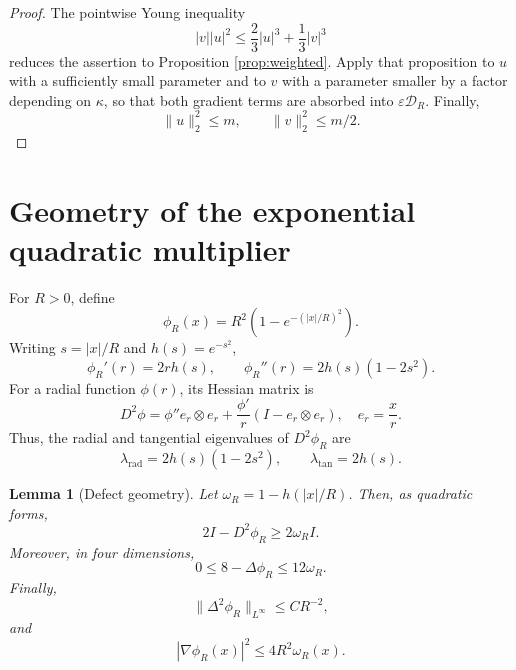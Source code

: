 \documentclass[10pt,a4paper]{amsart}
\numberwithin{equation}{section}
\newtheorem{lemma}[theorem]{Lemma}
\begin{document}
\begin{proof}
The pointwise Young inequality
\[
 |v||u|^2\le \frac23|u|^3+\frac13|v|^3
\]
reduces the assertion to Proposition \ref{prop:weighted}.  Apply that proposition to $u$ with a sufficiently small parameter and to $v$ with a parameter smaller by a factor depending on $\kappa$, so that both gradient terms are absorbed into $\varepsilon\mathcal D_R$.  Finally,
\[
 \|u\|_2^2\le m, \qquad \|v\|_2^2\le m/2.
\]
\end{proof}

\section{Geometry of the exponential quadratic multiplier}\label{sec:geometry}

For $R>0$, define
\begin{equation*}
 \phi_R(x)=R^2\left(1-e^{-(|x|/R)^2}\right).
\end{equation*}
Writing $s=|x|/R$ and $h(s)=e^{-s^2}$,
\begin{equation*}
 \phi_R'(r)=2rh(s), \qquad \phi_R''(r)=2h(s)(1-2s^2).
\end{equation*}
For a radial function $\phi(r)$, its Hessian matrix is
\[
D^2\phi = \phi'' e_r \otimes e_r + \frac{\phi'}{r} (I-e_r\otimes e_r), \quad e_r = \frac{x}{r}.
\]
Thus, the radial and tangential eigenvalues of $D^2\phi_R$ are
\begin{equation*}
 \lambda_{\mathrm{rad}}=2h(s)(1-2s^2), \qquad \lambda_{\mathrm{tan}}=2h(s).
\end{equation*}

\begin{lemma}[Defect geometry]\label{lem:geometry}
Let $\omega_R=1-h(|x|/R)$.  Then, as quadratic forms,
\begin{equation}\label{eq:hessian-defect}
 2I-D^2\phi_R\ge 2\omega_R I.
\end{equation}
Moreover, in four dimensions,
\begin{equation}\label{eq:theta-bound}
 0\le 8-\Delta \phi_R \le 12\omega_R.
\end{equation}
Finally,
\begin{equation}\label{eq:linear-derivative}
 \|\Delta^2\phi_R\|_{L^\infty}\le CR^{-2},
\end{equation}
and
\begin{equation}\label{eq:virial-geometry}
 |\nabla\phi_R(x)|^2\le4R^2\omega_R(x).
\end{equation}
\end{lemma}
\end{document}
